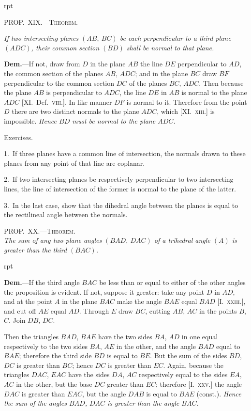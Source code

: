 \documentclass[oneside]{book}
\newcommand\myprop[2]{
\bigskip\Needspace*{4\baselineskip}\begin{center}\textsc{#1}\\\medskip\emph{#2}\par\end{center}
}
\newcommand\mypropflot[5]{
\vspace{0.5\baselineskip}
\bigskip\Needspace*{4\baselineskip}
\setcounter{wrapwidth}{#3}
\begin{wrapfigure}[#4]{r}{\value{wrapwidth}pt}
\begin{center}
\vspace{-0.3in}
\end{center}
\end{wrapfigure}
\hspace{1.5\parindent}\textsc{#1}\par\medskip
\indent\emph{#2}\par\medskip
}
\newcommand\exhead[1]{
\Needspace*{5\baselineskip}\begin{center}
\textsf{#1}
\end{center}
}
\newcommand\imgflow[3]{
\setcounter{wrapwidth}{#1}
\begin{wrapfigure}[#2]{r}{\value{wrapwidth}pt}
\begin{center}
\vspace{-0.3in}
\end{center}
\end{wrapfigure}
}
\begin{document}
\mypropflot{PROP\@.~XIX\@.---Theorem.}{If two intersecting planes $(AB,\ BC)$ be each perpendicular
to a third plane $(ADC)$, their common section $(BD)$
shall be normal to that plane.}{115}{11}{f233}

\textbf{Dem.}---If not, draw from $D$ in the plane $AB$ the
line $DE$ perpendicular to $AD$,
the common section of the planes
$AB$, $ADC$; and in the plane $BC$
draw $BF$ perpendicular to the
common section $DC$ of the planes
$BC$, $ADC$. Then because the
plane $AB$ is perpendicular to
$ADC$, the line $DE$ in $AB$ is
normal to the plane $ADC$ [XI\@.\ Def.~\textsc{viii.}].
In like manner $DF$
is normal to it. Therefore from
the point $D$ there are two distinct normals to the
plane $ADC$, which [XI\@.~\textsc{xiii.}] is impossible. \emph{Hence
$BD$ must be normal to the plane $ADC$.}


\exhead{Exercises.}

\begin{footnotesize}
1.~If three planes have a common line of intersection, the normals
drawn to these planes from any point of that line are coplanar.

2.~If two intersecting planes be respectively perpendicular to
two intersecting lines, the line of intersection of the former is
normal to the plane of the latter.

3.~In the last case, show that the dihedral angle between the
planes is equal to the rectilineal angle between the normals.
\par\end{footnotesize}

\myprop{PROP\@.~XX\@.---Theorem.}{The sum of any two plane angles $(BAD,\ DAC)$ of a
trihedral angle $(A)$ is greater than the third $(BAC)$.}

\imgflow{150}{8}{f234}

\textbf{Dem.}---If the third angle $BAC$ be less than or equal
to either of the other
angles the proposition is
evident. If not, suppose it
greater: take any point
$D$ in $AD$, and at the
point $A$ in the plane $BAC$
make the angle $BAE$
equal $BAD$ [I.~\textsc{xxiii.}],
and cut off $AE$ equal $AD$. Through $E$ draw $BC$, cutting
$AB$, $AC$ in the points $B$, $C$. Join $DB$, $DC$.

Then the triangles $BAD$, $BAE$ have the two sides
$BA$, $AD$ in one equal respectively to the two sides
$BA$, $AE$ in the other, and the angle $BAD$ equal to
$BAE$; therefore the third side $BD$ is equal to $BE$.
But the sum of the sides $BD$, $DC$ is greater than $BC$;
hence $DC$ is greater than $EC$. Again, because the
triangles $DAC$, $EAC$ have the sides $DA$, $AC$ respectively
equal to the sides $EA$, $AC$ in the other, but the
base $DC$ greater than $EC$; therefore [I.~\textsc{xxv.}] the angle
$DAC$ is greater than $EAC$, but the angle $DAB$ is equal
to $BAE$ (const.). \emph{Hence the sum of the angles $BAD$,
$DAC$  is greater than the angle $BAC$.}
\end{document}
